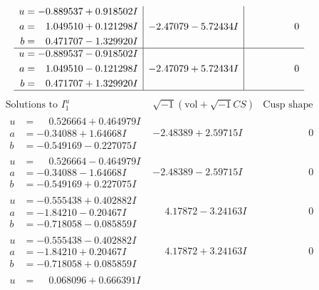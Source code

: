 \documentclass[1p]{elsarticle_modified}
\theoremstyle{definition}
\newcommand{\I}{\sqrt{-1}}
\begin{document}
$$\begin{array}{c|c|c}
\begin{aligned}
u &= -0.889537 + 0.918502 I \\
a &= \phantom{-}1.049510 + 0.121298 I \\
b &= \phantom{-}0.471707 - 1.329920 I\end{aligned}
 & -2.47079 - 5.72434 I & \phantom{-0.000000 } 0 \\ \hline\begin{aligned}
u &= -0.889537 - 0.918502 I \\
a &= \phantom{-}1.049510 - 0.121298 I \\
b &= \phantom{-}0.471707 + 1.329920 I\end{aligned}
 & -2.47079 + 5.72434 I & \phantom{-0.000000 } 0\\
 \hline 
 \end{array}$$\newpage$$\begin{array}{c|c|c}  
\text{Solutions to }I^u_{1}& \I (\text{vol} + \sqrt{-1}CS) & \text{Cusp shape}\\
 \hline 
\begin{aligned}
u &= \phantom{-}0.526664 + 0.464979 I \\
a &= -0.34088 + 1.64668 I \\
b &= -0.549169 - 0.227075 I\end{aligned}
 & -2.48389 + 2.59715 I & \phantom{-0.000000 } 0 \\ \hline\begin{aligned}
u &= \phantom{-}0.526664 - 0.464979 I \\
a &= -0.34088 - 1.64668 I \\
b &= -0.549169 + 0.227075 I\end{aligned}
 & -2.48389 - 2.59715 I & \phantom{-0.000000 } 0 \\ \hline\begin{aligned}
u &= -0.555438 + 0.402882 I \\
a &= -1.84210 - 0.20467 I \\
b &= -0.718058 - 0.085859 I\end{aligned}
 & \phantom{-}4.17872 - 3.24163 I & \phantom{-0.000000 } 0 \\ \hline\begin{aligned}
u &= -0.555438 - 0.402882 I \\
a &= -1.84210 + 0.20467 I \\
b &= -0.718058 + 0.085859 I\end{aligned}
 & \phantom{-}4.17872 + 3.24163 I & \phantom{-0.000000 } 0 \\ \hline\begin{aligned}
u &= \phantom{-}0.068096 + 0.666391 I \\

\end{aligned}
\end{array}$$
\end{document}
